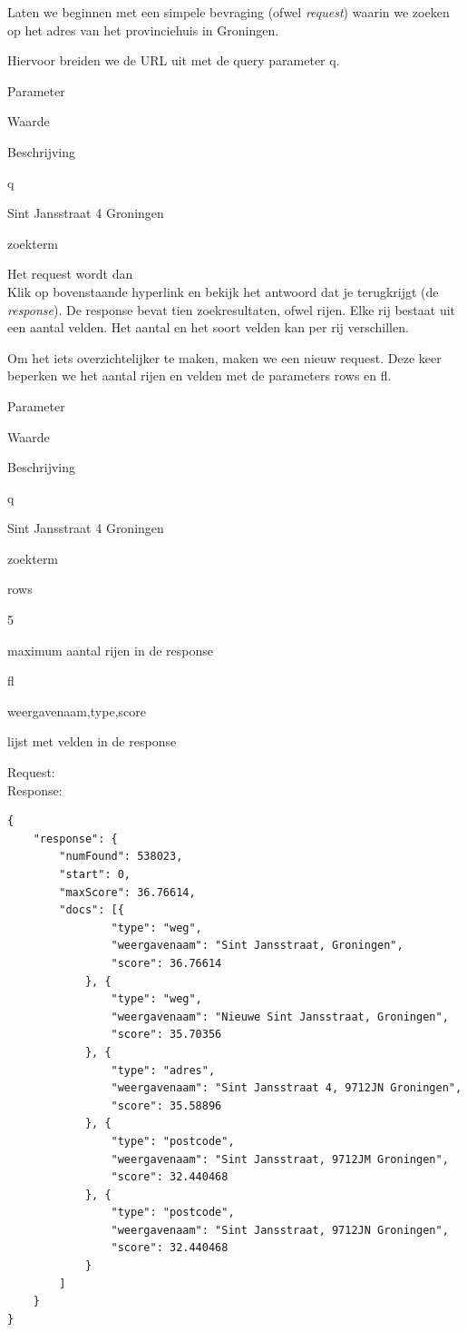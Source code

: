 \documentclass[]{book}
\begin{document}
Laten we beginnen met een simpele bevraging (ofwel \emph{request}) waarin we zoeken op het adres van het provinciehuis in Groningen.

Hiervoor breiden we de URL uit met de query parameter {q}.

Parameter

Waarde

Beschrijving

{q}

{Sint Jansstraat 4 Groningen}

zoekterm

Het request wordt dan\\

Klik op bovenstaande hyperlink en bekijk het antwoord dat je terugkrijgt (de \emph{response}). De response bevat tien zoekresultaten, ofwel rijen. Elke rij bestaat uit een aantal velden. Het aantal en het soort velden kan per rij verschillen.

Om het iets overzichtelijker te maken, maken we een nieuw request. Deze keer beperken we het aantal rijen en velden met de parameters {rows} en {fl}.

Parameter

Waarde

Beschrijving

{q}

{Sint Jansstraat 4 Groningen}

zoekterm

{rows}

{5}

maximum aantal rijen in de response

{fl}

{weergavenaam,type,score}

lijst met velden in de response

Request:\\

Response:

\begin{verbatim}
{
    "response": {
        "numFound": 538023,
        "start": 0,
        "maxScore": 36.76614,
        "docs": [{
                "type": "weg",
                "weergavenaam": "Sint Jansstraat, Groningen",
                "score": 36.76614
            }, {
                "type": "weg",
                "weergavenaam": "Nieuwe Sint Jansstraat, Groningen",
                "score": 35.70356
            }, {
                "type": "adres",
                "weergavenaam": "Sint Jansstraat 4, 9712JN Groningen",
                "score": 35.58896
            }, {
                "type": "postcode",
                "weergavenaam": "Sint Jansstraat, 9712JM Groningen",
                "score": 32.440468
            }, {
                "type": "postcode",
                "weergavenaam": "Sint Jansstraat, 9712JN Groningen",
                "score": 32.440468
            }
        ]
    }
}
\end{verbatim}
\end{document}
